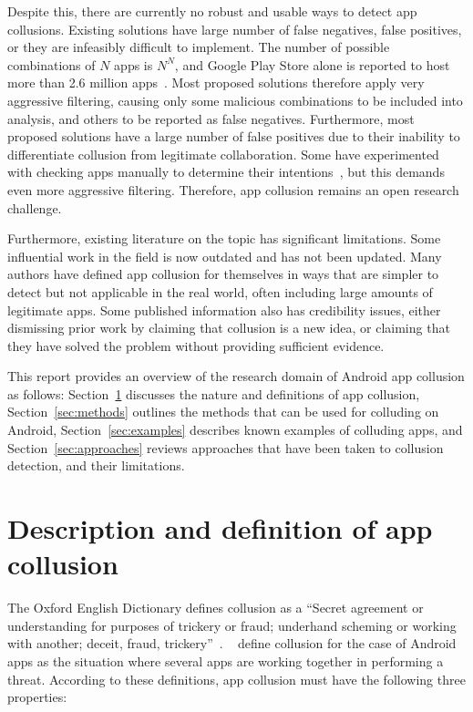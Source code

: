 \documentclass[article]{aaltoseries}
\newcommand{\Sref}[1]{Section~\ref{#1}}
\begin{document}
Despite this, there are currently no robust and usable ways to detect app collusions. Existing solutions have large number of false negatives, false positives, or they are infeasibly difficult to implement. The number of possible combinations of $N$ apps is $N^N$, and Google Play Store alone is reported to host more than 2.6 million apps~\cite{Statista2018}. Most proposed solutions therefore apply very aggressive filtering, causing only some malicious combinations to be included into analysis, and others to be reported as false negatives. Furthermore, most proposed solutions have a large number of false positives due to their inability to differentiate collusion from legitimate collaboration. Some have experimented with checking apps manually to determine their intentions~\cite{Muttik2016}, but this demands even more aggressive filtering. Therefore, app collusion remains an open research challenge.

Furthermore, existing literature on the topic has significant limitations. Some influential work in the field is now outdated and has not been updated. Many authors have defined app collusion for themselves in ways that are simpler to detect but not applicable in the real world, often including large amounts of legitimate apps. Some published information also has credibility issues, either dismissing prior work by claiming that collusion is a new idea, or claiming that they have solved the problem without providing sufficient evidence.

This report provides an overview of the research domain of Android app collusion as follows: \Sref{sec:def} discusses the nature and definitions of app collusion, \Sref{sec:methods} outlines the methods that can be used for colluding on Android, \Sref{sec:examples} describes known examples of colluding apps, and \Sref{sec:approaches} reviews approaches that have been taken to collusion detection, and their limitations.

\section{Description and definition of app collusion}
\label{sec:def}

The Oxford English Dictionary defines collusion as a ``Secret agreement or understanding for purposes of trickery or fraud; underhand scheming or working with another; deceit, fraud, trickery''~\cite{OEDcollusion}. \citeauthor{Asavoae2017}~\cite{Asavoae2017} define collusion for the case of Android apps as the situation where several apps are working together in performing a threat. According to these definitions, app collusion must have the following three properties:
\end{document}

